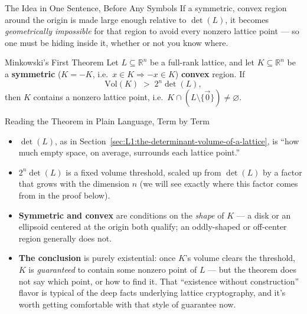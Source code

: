\begin{rmkbox}{The Idea in One Sentence, Before Any Symbols}
If a symmetric, convex region around the origin is made large enough relative to $\det(L)$, it becomes \emph{geometrically impossible} for that region to avoid every nonzero lattice point --- so one must be hiding inside it, whether or not you know where.
\end{rmkbox}

\begin{defbox}{Minkowski's First Theorem}
Let $L \subseteq \mathbb{R}^n$ be a full-rank lattice, and let $K \subseteq \mathbb{R}^n$ be a \textbf{symmetric} ($K = -K$, i.e.\ $x \in K \Rightarrow -x \in K$) \textbf{convex} region. If
$$
\mathrm{Vol}(K) \;>\; 2^n \det(L),
$$
then $K$ contains a nonzero lattice point, i.e.\ $K \cap (L \setminus \{\vec 0\}) \ne \varnothing$.
\end{defbox}

\begin{rmkbox}{Reading the Theorem in Plain Language, Term by Term}
\begin{itemize}[leftmargin=*]
  \item \textbf{$\det(L)$}, as in Section~\ref{sec:L1:the-determinant-volume-of-a-lattice}, is ``how much empty space, on average, surrounds each lattice point.''
  \item \textbf{$2^n \det(L)$} is a fixed volume threshold, scaled up from $\det(L)$ by a factor that grows with the dimension $n$ (we will see exactly where this factor comes from in the proof below).
  \item \textbf{Symmetric and convex} are conditions on the \emph{shape} of $K$ --- a disk or an ellipsoid centered at the origin both qualify; an oddly-shaped or off-center region generally does not.
  \item \textbf{The conclusion} is purely existential: once $K$'s volume clears the threshold, $K$ is \emph{guaranteed} to contain some nonzero point of $L$ --- but the theorem does not say which point, or how to find it. That ``existence without construction'' flavor is typical of the deep facts underlying lattice cryptography, and it's worth getting comfortable with that style of guarantee now.
\end{itemize}
\end{rmkbox}

